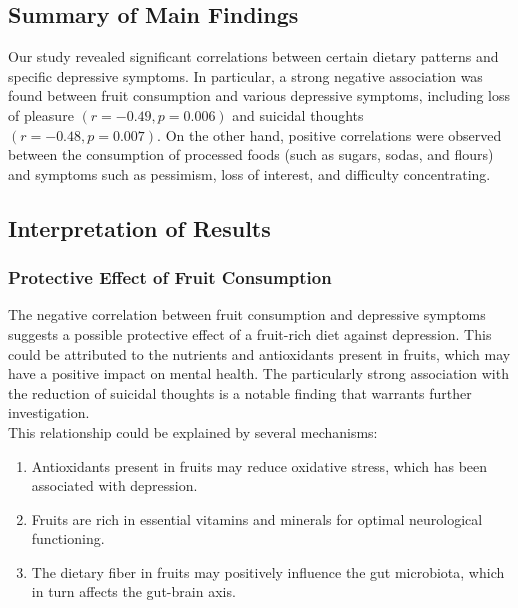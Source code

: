\documentclass[jou]{apa7}
\begin{document}
\subsection{Summary of Main Findings}\label{resumen-de-hallazgos-principales}

Our study revealed significant correlations between certain dietary patterns and specific depressive symptoms. In particular, a strong negative association was found between fruit consumption and various depressive symptoms, including loss of pleasure $(r = -0.49, p = 0.006)$ and suicidal thoughts $(r = -0.48, p = 0.007)$. On the other hand, positive correlations were observed between the consumption of processed foods (such as sugars, sodas, and flours) and symptoms such as pessimism, loss of interest, and difficulty concentrating.\\

\subsection{Interpretation of Results}\label{interpretaciuxf3n-de-resultados}

\subsubsection{Protective Effect of Fruit Consumption}

The negative correlation between fruit consumption and depressive symptoms suggests a possible protective effect of a fruit-rich diet against depression. This could be attributed to the nutrients and antioxidants present in fruits, which may have a positive impact on mental health. The particularly strong association with the reduction of suicidal thoughts is a notable finding that warrants further investigation.\\

This relationship could be explained by several mechanisms:

\begin{enumerate}
	\item Antioxidants present in fruits may reduce oxidative stress, which has been associated with depression.\\

	\item Fruits are rich in essential vitamins and minerals for optimal neurological functioning.\\

	\item The dietary fiber in fruits may positively influence the gut microbiota, which in turn affects the gut-brain axis.
\end{enumerate}
\end{document}
